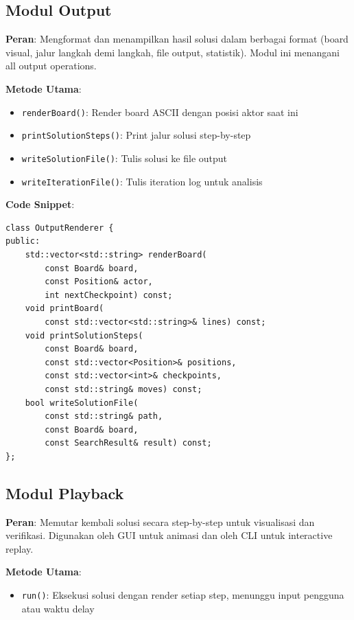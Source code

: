 \subsection{Modul Output}

\textbf{Peran}: Mengformat dan menampilkan hasil solusi dalam berbagai format (board visual, jalur langkah demi langkah, file output, statistik). Modul ini menangani all output operations.

\textbf{Metode Utama}:
\begin{itemize}
    \item \texttt{renderBoard()}: Render board ASCII dengan posisi aktor saat ini
    \item \texttt{printSolutionSteps()}: Print jalur solusi step-by-step
    \item \texttt{writeSolutionFile()}: Tulis solusi ke file output
    \item \texttt{writeIterationFile()}: Tulis iteration log untuk analisis
\end{itemize}

\textbf{Code Snippet}:
\begin{tcolorbox}[colback=blue!5, title=OutputRenderer Class Header]
    \begin{verbatim}
class OutputRenderer {
public:
    std::vector<std::string> renderBoard(
        const Board& board,
        const Position& actor,
        int nextCheckpoint) const;
    void printBoard(
        const std::vector<std::string>& lines) const;
    void printSolutionSteps(
        const Board& board,
        const std::vector<Position>& positions,
        const std::vector<int>& checkpoints,
        const std::string& moves) const;
    bool writeSolutionFile(
        const std::string& path,
        const Board& board,
        const SearchResult& result) const;
};
\end{verbatim}
\end{tcolorbox}

\subsection{Modul Playback}

\textbf{Peran}: Memutar kembali solusi secara step-by-step untuk visualisasi dan verifikasi. Digunakan oleh GUI untuk animasi dan oleh CLI untuk interactive replay.

\textbf{Metode Utama}:
\begin{itemize}
    \item \texttt{run()}: Eksekusi solusi dengan render setiap step, menunggu input pengguna atau waktu delay
\end{itemize}

